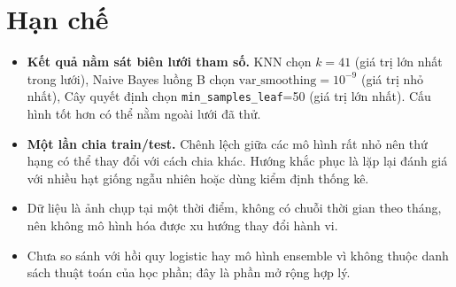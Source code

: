\section{Hạn chế}
\begin{itemize}
    \item \textbf{Kết quả nằm sát biên lưới tham số.} KNN chọn $k=41$ (giá trị lớn nhất trong lưới), Naive Bayes luồng B chọn $\text{var\_smoothing}=10^{-9}$ (giá trị nhỏ nhất), Cây quyết định chọn \texttt{min\_samples\_leaf}=50 (giá trị lớn nhất). Cấu hình tốt hơn có thể nằm ngoài lưới đã thử.
    \item \textbf{Một lần chia train/test.} Chênh lệch giữa các mô hình rất nhỏ nên thứ hạng có thể thay đổi với cách chia khác. Hướng khắc phục là lặp lại đánh giá với nhiều hạt giống ngẫu nhiên hoặc dùng kiểm định thống kê.
    \item Dữ liệu là ảnh chụp tại một thời điểm, không có chuỗi thời gian theo tháng, nên không mô hình hóa được xu hướng thay đổi hành vi.
    \item Chưa so sánh với hồi quy logistic hay mô hình ensemble vì không thuộc danh sách thuật toán của học phần; đây là phần mở rộng hợp lý.
\end{itemize}
